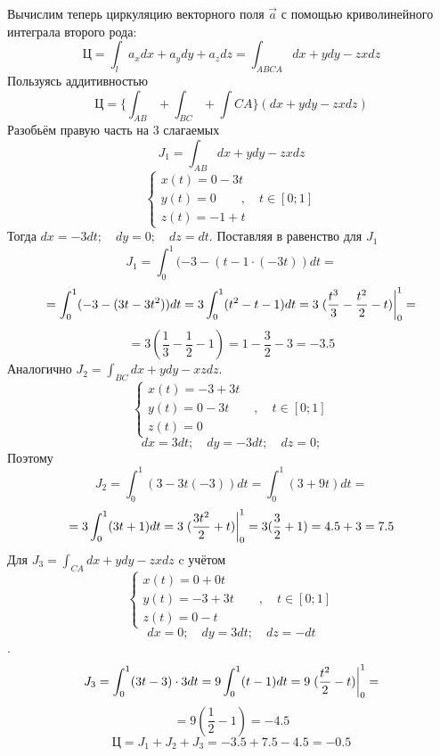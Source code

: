 \documentclass[11pt]{article}
\begin{document}
Вычислим теперь циркуляцию векторного поля $\vec{a}$ с помощью криволинейного интеграла второго рода:
\[\text{Ц} = \int_l a_xdx + a_ydy + a_zdz = \int_{ABCA}dx+ ydy - zxdz\]
Пользуясь аддитивностью
\[\text{Ц} = \Big\lbrace \int_{AB} + \int_{BC} + \int{CA} \Big\rbrace (dx + ydy - zxdz)\]
Разобьём правую часть на 3 слагаемых
\[J_1 = \int_{AB}dx + ydy - zxdz\]
\[
\begin{cases}
	x(t) = 0 - 3t \\
	y(t) = 0 \quad\quad , \quad t\in [0; 1] \\
	z(t) = -1 + t
\end{cases}
\]
Тогда $dx = -3dt; \quad dy = 0; \quad dz = dt$. Поставляя в равенство для $J_1$
\[J_1 = \int_0^1(-3 - (t-1\cdot(-3t))dt = \]
\[= \int_0^1(-3 - (3t - 3t^2))dt = 3\int_0^1(t^2 - t - 1)dt = 3\eval{(\frac{t^3}{3}- \frac{t^2}{2} - t)}_0^1 = \]
\[= 3 (\frac{1}{3} - \frac{1}{2} - 1) = 1 - \frac{3}{2} - 3 = -3.5\]
Аналогично $J_2 = \int_{BC}dx + ydy - xzdz$.
\[
\begin{cases}
	x(t) = -3 + 3t \\
	y(t) = 0 - 3t \quad\quad , \quad t\in [0; 1] \\
	z(t) = 0
\end{cases}
\]
\[dx = 3dt; \quad dy = -3dt; \quad dz = 0; \]
Поэтому
\[J_2 = \int_0^1(3 - 3t(-3)) dt = \int_0^1(3 + 9t)dt = \]
\[= 3\int_0^1(3t + 1)dt = 3\eval{(\frac{3t^2}{2} + t)}_0^1 = 3(\frac{3}{2} + 1) = 4.5 + 3 = 7.5\]
Для $J_3 = \int_{CA}dx + ydy - zxdz$ c учётом
\[
\begin{cases}
	x(t) = 0 + 0t \\
	y(t) = -3 + 3t \quad\quad , \quad t\in [0; 1] \\
	z(t) = 0 - t
\end{cases}
\]
\[dx = 0; \quad dy = 3dt; \quad	dz = -dt \].
\[J_3 = \int_0^1(3t-3)\cdot 3 dt = 9\int_0^1 (t-1)dt = 9\eval{(\frac{t^2}{2} - t)}_0^1 = \]
\[= 9(\frac{1}{2} - 1) = -4.5\]
\[\text{Ц} = J_1 + J_2 + J_3 = -3.5 + 7.5 - 4.5 = -0.5\]
\end{document}

